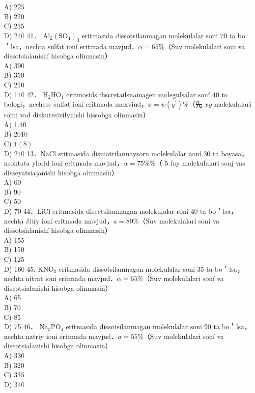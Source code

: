 A) 225\\
B) 220\\
C) 235\\
D) 240
41． $\mathrm{Al}_{2}\left(\mathrm{SO}_{4}\right)_{3}$ eritmasida dissotsilanmagan molekulalar soni 70 ta bo＇lsa，nechta sulfat ioní eritmada mavjud．$\alpha=65 \%$（Suv molekulalari soni va dissotsialanishí hisobga olinmasin）\\
A) 390\\
B) 350\\
C) 210\\
D) 140
42． $\mathrm{H}_{2} \mathrm{HO}_{1}$ critmosids discretailsnamagen molegulsalar soní 40 to bologi，nechese sulfat ioní eritmada maxviud，$x=\psi\left(y^{\prime}\right) \%$（先 $x y$ molekulalari somi vad diskutesivilynishi hissobga olinmasin）\\
A) 1.40\\
B) 2010\\
C) $1(8)$\\
D) 240
13．NaCl sritmasida dismatrilannaysorn molekulalar aoní 30 ta boyasa，nsohtata ylorid ioni eritmada mavjud，$\alpha=75 \% \%$（ 5 fuy molekulalari sonj vas disseyatsiajanishi hisobga olinmasín）\\
A) 60\\
B) 90\\
C) 50\\
D) 70
44．LiCl eritmasida disectsilanmagan molekulalar roni 40 ta bo＇lsa，nechta Jítíy ioní eritmada mavjud，$a=80 \%$（Suv molekulalarí soní va dissotsíalanishí hisobga olinmasin）\\
A) 155\\
B) 150\\
C) 125\\
D) 160
45. $\mathrm{KNO}_{3}$ erítmasida dissotsilanmagan molekulalar soni 35 ta bo＇lsa，nechta nítrat ioni eritmada mavjud．$\alpha=65 \%$（Suv molekulalari soní va discotsialanishí hisobga olinmasin）\\
A) 65\\
B) 70\\
C) 85\\
D) 75
46． $\mathrm{Na}_{3} \mathrm{PO}_{4}$ erítmasida dissotsílanmagan molekulalar soni 90 ta bo＇lsa，nechta natriy ioni eritmada mavjud．$a=55 \%$（Suv molekulalari soní va diseotsialanishi hisobga olinmasin）\\
A) 330\\
B) 320\\
C) 335\\
D) 340

